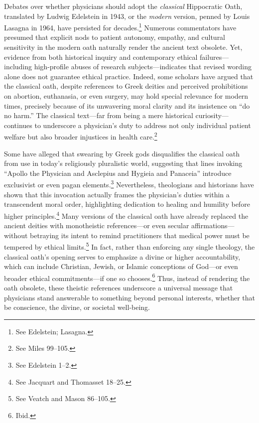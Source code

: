 \documentclass[12pt]{article}
\begin{document}
Debates over whether physicians should adopt the \textit{classical} Hippocratic Oath, translated by Ludwig Edelstein in 1943, or the \textit{modern} version, penned by Louis Lasagna in 1964, have persisted for decades.\footnote{See Edelstein; Lasagna.} Numerous commentators have presumed that explicit nods to patient autonomy, empathy, and cultural sensitivity in the modern oath naturally render the ancient text obsolete. Yet, evidence from both historical inquiry and contemporary ethical failures—including high-profile abuses of research subjects—indicates that revised wording alone does not guarantee ethical practice. Indeed, some scholars have argued that the classical oath, despite references to Greek deities and perceived prohibitions on abortion, euthanasia, or even surgery, may hold special relevance for modern times, precisely because of its unwavering moral clarity and its insistence on “do no harm.” The classical text—far from being a mere historical curiosity—continues to underscore a physician’s duty to address not only individual patient welfare but also broader injustices in health care.\footnote{See Miles 99--105.}

\bigskip

Some have alleged that swearing by Greek gods disqualifies the classical oath from use in today’s religiously pluralistic world, suggesting that lines invoking “Apollo the Physician and Asclepius and Hygieia and Panaceia” introduce exclusivist or even pagan elements.\footnote{See Edelstein 1--2.} Nevertheless, theologians and historians have shown that this invocation actually frames the physician’s duties within a transcendent moral order, highlighting dedication to healing and humility before higher principles.\footnote{See Jacquart and Thomasset 18--25.} Many versions of the classical oath have already replaced the ancient deities with monotheistic references—or even secular affirmations—without betraying its intent to remind practitioners that medical power must be tempered by ethical limits.\footnote{See Veatch and Mason 86--105.} In fact, rather than enforcing any single theology, the classical oath’s opening serves to emphasize a divine or higher accountability, which can include Christian, Jewish, or Islamic conceptions of God—or even broader ethical commitments—if one so chooses.\footnote{Ibid.} Thus, instead of rendering the oath obsolete, these theistic references underscore a universal message that physicians stand answerable to something beyond personal interests, whether that be conscience, the divine, or societal well-being.
\end{document}
